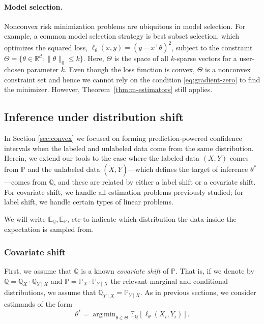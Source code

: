 \documentclass[10pt]{article}
\def\R{\mathbb{R}}
\def\E{\mathbb{E}}
\renewcommand{\P}{\mathbb{P}}
\newcommand{\Q}{\mathbb{Q}}
\newcommand{\Xt}{\widetilde{X}}
\newcommand{\Yt}{\widetilde{Y}}
\DeclareMathOperator*{\argmin}{arg\,min}
\begin{document}
\paragraph{Model selection.} Nonconvex risk minimization problems are ubiquitous in model selection. For example, a common model selection strategy is best subset selection, which optimizes the squared loss, $\ell_\theta(x,y) = (y-x^\top\theta)^2$, subject to the constraint $\Theta = \{\theta\in\R^d:\|\theta\|_0 \leq k\}$.
Here, $\Theta$ is the space of all $k$-sparse vectors for a user-chosen parameter $k$. Even though the loss function is convex, $\Theta$ is a nonconvex constraint set and hence we cannot rely on the condition \eqref{eq:gradient-zero} to find the minimizer.
However, Theorem~\ref{thm:m-estimators} still applies.



\subsection{Inference under distribution shift}
\label{sec:dist-shift}

In Section \ref{sec:convex} we focused on forming prediction-powered confidence intervals when the labeled and unlabeled data come from the same distribution.
Herein, we extend our tools to the case where the labeled data $(X,Y)$ comes from $\P$ and the unlabeled data $(\Xt,\Yt)$---which defines the target of inference $\theta^*$---comes from $\Q$, and these are related by either a label shift or a covariate shift. For covariate shift, we handle all estimation problems previously studied; for label shift, we handle certain types of linear problems.

We will write $\E_{\Q},\E_{\P}$, etc to indicate which distribution the data inside the expectation is sampled from.



\subsubsection{Covariate shift}

First, we assume that $\mathbb{Q}$ is a known \emph{covariate shift} of $\P$. That is, if we denote by $\Q = \Q_X \cdot \Q_{Y \mid X}$ and $\P = \P_X \cdot \P_{Y \mid X}$ the relevant marginal and conditional distributions, we assume that $\Q_{Y \mid X} = \P_{Y \mid X}$. As in previous sections, we consider estimands of the form
\begin{equation}
\label{eq:covariate_shift_estimands}
\theta^* = \argmin_{\theta\in \Theta} \E_{\Q} [\ell_\theta(X_i,Y_i)].
\end{equation}
\end{document}
